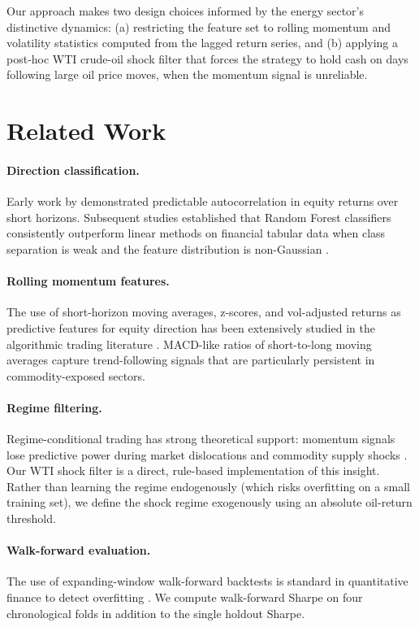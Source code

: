 \documentclass{article}
\begin{document}
Our approach makes two design choices informed by the energy sector's distinctive
dynamics: (a) restricting the feature set to rolling momentum and volatility
statistics computed from the lagged return series, and (b) applying a post-hoc
WTI crude-oil shock filter that forces the strategy to hold cash on days following
large oil price moves, when the momentum signal is unreliable.

\section{Related Work}

\paragraph{Direction classification.}
Early work by \citet{lo1988} demonstrated predictable autocorrelation in equity
returns over short horizons. Subsequent studies established that Random Forest classifiers
consistently outperform linear methods on financial tabular data when class separation is
weak and the feature distribution is non-Gaussian \citep{khaidem2016}.

\paragraph{Rolling momentum features.}
The use of short-horizon moving averages, z-scores, and vol-adjusted returns as
predictive features for equity direction has been extensively studied in the
algorithmic trading literature \citep{jegadeesh1993,moskowitz2012}.
MACD-like ratios of short-to-long moving averages capture trend-following signals
that are particularly persistent in commodity-exposed sectors.

\paragraph{Regime filtering.}
Regime-conditional trading has strong theoretical support: momentum signals lose
predictive power during market dislocations and commodity supply shocks
\citep{daniel2016}.
Our WTI shock filter is a direct, rule-based implementation of this insight.
Rather than learning the regime endogenously (which risks overfitting on a small
training set), we define the shock regime exogenously using an absolute oil-return threshold.

\paragraph{Walk-forward evaluation.}
The use of expanding-window walk-forward backtests is standard in quantitative finance
to detect overfitting \citep{bailey2014}. We compute walk-forward Sharpe on four
chronological folds in addition to the single holdout Sharpe.
\end{document}
